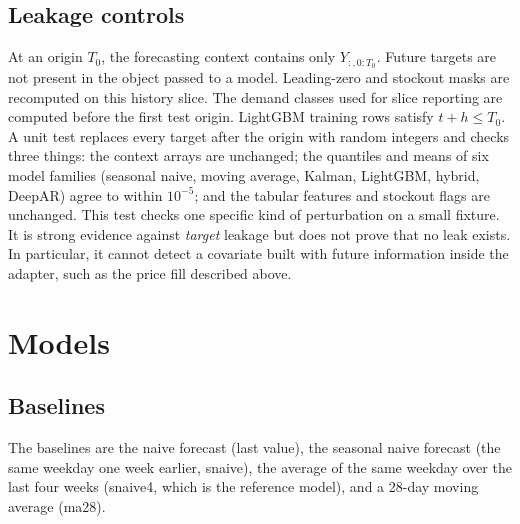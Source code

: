 \documentclass[conference]{IEEEtran}
\begin{document}
\subsection{Leakage controls}\label{sec:leak}
At an origin $T_0$, the forecasting context contains only $Y_{:,0:T_0}$. Future targets are not present in the object passed to a model. Leading-zero and stockout masks are recomputed on this history slice. The demand classes used for slice reporting are computed before the first test origin. LightGBM training rows satisfy $t+h\le T_0$. A unit test replaces every target after the origin with random integers and checks three things: the context arrays are unchanged; the quantiles and means of six model families (seasonal naive, moving average, Kalman, LightGBM, hybrid, DeepAR) agree to within $10^{-5}$; and the tabular features and stockout flags are unchanged. This test checks one specific kind of perturbation on a small fixture. It is strong evidence against \emph{target} leakage but does not prove that no leak exists. In particular, it cannot detect a covariate built with future information inside the adapter, such as the price fill described above.

\section{Models}\label{sec:models}
\subsection{Baselines}
The baselines are the naive forecast (last value), the seasonal naive forecast (the same weekday one week earlier, \textsf{snaive}), the average of the same weekday over the last four weeks (\textsf{snaive4}, which is the reference model), and a 28-day moving average (\textsf{ma28}).
\end{document}
